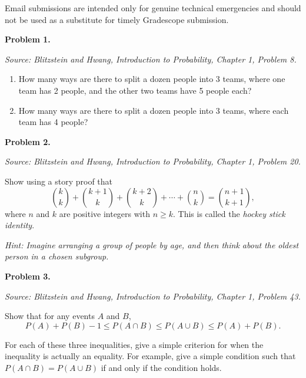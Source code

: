 \documentclass[11pt]{article}
\newcommand{\source}[1]{%
    \vspace{0.15cm}
    {\small\textit{Source: Blitzstein and Hwang, \textit{Introduction to Probability}, Chapter 1, Problem #1.}}
}
\begin{document}
Email submissions are intended only for genuine technical emergencies and should not be used as a substitute for timely Gradescope submission.

\newpage


\begin{problemheader}
\textbf{Problem 1. }
\end{problemheader}
\source{8}

\begin{enumerate}[label=(\alph*), leftmargin=*]
    \item How many ways are there to split a dozen people into 3 teams, where one team has 2 people, and the other two teams have 5 people each?

    \item How many ways are there to split a dozen people into 3 teams, where each team has 4 people?
\end{enumerate}

\vfill
 
\newpage


\begin{problemheader}
\textbf{Problem 2.}
\end{problemheader}
\source{20}

Show using a story proof that
\[
{ k \choose k}
+
{ k+1 \choose k}
+
{ k+2 \choose k}
+
\cdots
+
{ n \choose k}
=
{ n+1 \choose k+1},
\]
where $n$ and $k$ are positive integers with $n\ge k$. This is called the \emph{hockey stick identity}.

\emph{Hint: Imagine arranging a group of people by age, and then think about the oldest person in a chosen subgroup.}

\vfill
 
\newpage


\begin{problemheader}
\textbf{Problem 3. }
\end{problemheader}
\source{43}

Show that for any events $A$ and $B$,
\[
P(A)+P(B)-1
\le
P(A\cap B)
\le
P(A\cup B)
\le
P(A)+P(B).
\]

For each of these three inequalities, give a simple criterion for when the inequality is actually an equality. For example, give a simple condition such that $P(A\cap B)=P(A\cup B)$ if and only if the condition holds.
\end{document}
